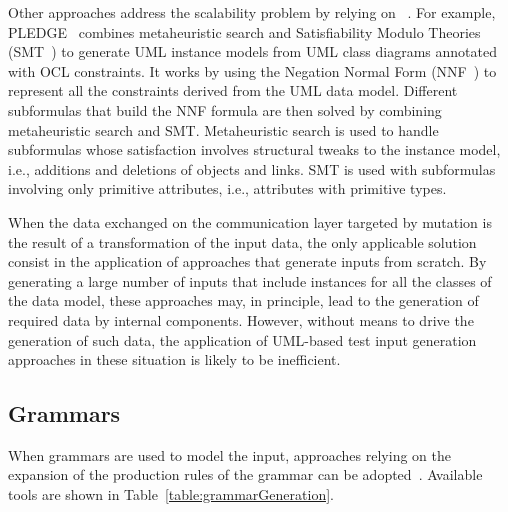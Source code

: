 
Other approaches address the scalability problem by relying on ~\cite{soltana2019practical}.
For example, PLEDGE~\cite{soltana2019practical} combines metaheuristic search and Satisfiability Modulo Theories (SMT~\cite{SMT:2011}) to generate UML instance models from UML class diagrams annotated with OCL constraints. It  works by using the Negation Normal Form (NNF~\cite{NNF:2001}) to represent all the constraints derived from the UML data model. Different subformulas that build the NNF formula are then solved by combining metaheuristic search and SMT. Metaheuristic search is used to handle subformulas whose satisfaction involves structural tweaks to the instance model, i.e., additions and deletions of objects and links. SMT is used with subformulas involving only primitive attributes, i.e., attributes with primitive types.


When the data exchanged on the communication layer targeted by mutation is the result of a transformation of the input data, the only applicable solution consist in the application of approaches that generate inputs from scratch. By generating a large number of inputs that include instances for all the classes of the data model, these approaches may, in principle, lead to the generation of required data by internal components. However, without means to drive the generation of such data, the application of UML-based test input generation approaches in these situation is likely to be inefficient.


\subsection{Grammars}

When grammars are used to model the input,  approaches relying on the expansion of the production rules of the grammar can be adopted~\cite{fuzzingbook2019:GrammarFuzzer}.
Available tools are shown in Table~\ref{table:grammarGeneration}.

